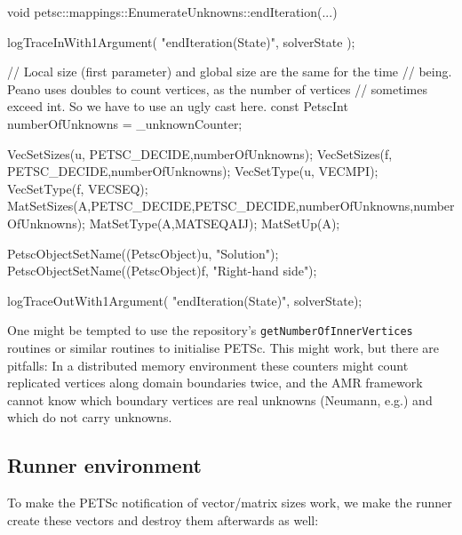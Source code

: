 \begin{code}
void petsc::mappings::EnumerateUnknowns::endIteration(...) {
  logTraceInWith1Argument( "endIteration(State)", solverState );

  // Local size (first parameter) and global size are the same for the time
  // being. Peano uses doubles to count vertices, as the number of vertices
  // sometimes exceed int. So we have to use an ugly cast here.
  const PetscInt numberOfUnknowns = _unknownCounter;

  VecSetSizes(u, PETSC_DECIDE,numberOfUnknowns);
  VecSetSizes(f, PETSC_DECIDE,numberOfUnknowns);
  VecSetType(u, VECMPI);
  VecSetType(f, VECSEQ);
  MatSetSizes(A,PETSC_DECIDE,PETSC_DECIDE,numberOfUnknowns,numberOfUnknowns);
  MatSetType(A,MATSEQAIJ);
  MatSetUp(A);

  PetscObjectSetName((PetscObject)u, "Solution");
  PetscObjectSetName((PetscObject)f, "Right-hand side");

  logTraceOutWith1Argument( "endIteration(State)", solverState);
}
\end{code}


\begin{remark}
 One might be tempted to use the repository's \texttt{getNumberOfInnerVertices}
 routines or similar routines to initialise PETSc.
 This might work, but there are pitfalls: In a distributed memory environment
 these counters might count replicated vertices along domain boundaries twice,
 and the AMR framework cannot know which boundary vertices are real unknowns
 (Neumann, e.g.) and which do not carry unknowns.
\end{remark}


\subsection{Runner environment}

To make the PETSc notification of vector/matrix sizes work, we make the runner
create these vectors and destroy them afterwards as well:


